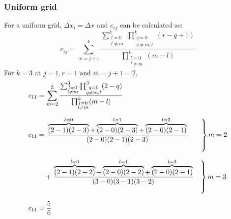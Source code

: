 \documentclass[12pt,a4paper,fleqn]{article}
\begin{document}
\subsubsection{Uniform grid}
For a uniform grid, \(\Delta x_i = \Delta x\) and \(c_{rj}\) can be calculated as:
\begin{equation}
c_{rj} = \sum_{m=j+1}^{k}
\frac{\sum_{\substack{l=0\\l\ne m}}^{k}\prod_{\substack{q=0\\q\ne m,l}}^{k}\left(r-q+1\right)}
{\prod_{\substack{l=0\\l\ne m}}^{k}\left(m-l\right)}
\end{equation}
For \(k=3\) at \(j=1, r=1 \text{ and } m=j+1=2\),
\begin{equation*}
\setlength{\jot}{10pt}
\begin{aligned}
c_{11} &= \sum_{m=2}^{3}
\frac{\sum_{\substack{l=0\\l\ne m}}^{3}\prod_{\substack{q=0\\q\ne m,l}}^{3}(2-q)}
{\prod_{\substack{l=0\\l\ne m}}^{k}(m-l)}\\
c_{11}&= \left.\frac{\overbrace{(2-1)(2-3)}^{l=0}+\overbrace{(2-0)(2-3)}^{l=1}+\overbrace{(2-0)(2-1)}^{l=3}}
{(2-0)(2-1)(2-3)}\qquad\right\}m=2\\
&\quad + \left.\frac{\overbrace{(2-1)(2-2)}^{l=0}+\overbrace{(2-0)(2-2)}^{l=1}+\overbrace{(2-0)(2-1)}^{l=3}}
{(3-0)(3-1)(3-2)}\quad\right\}m=3\\
c_{11} &= \frac{5}{6}
\end{aligned}
\end{equation*}

\newpage
\end{document}
